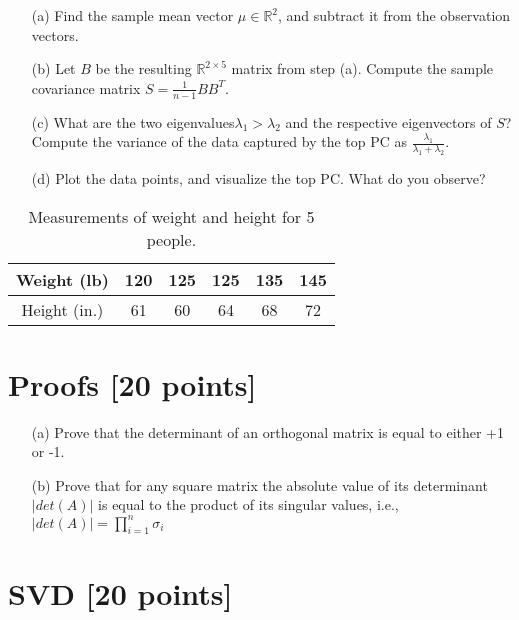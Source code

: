 	\begin{itemize}
		
	\item[(a)] 	 Find the sample mean vector $\mu \in \mathbb{R}^2$, and subtract it from the observation vectors. 
	
	\item[(b)] Let $B$ be the resulting $\mathbb{R}^{2 \times 5}$ matrix from step (a). Compute the sample covariance matrix $S=\frac{1}{n-1}BB^T$. 
	
	\item[(c)] What are the two eigenvalues$\lambda_1 > \lambda_2$ and the respective eigenvectors of $S$? Compute the variance of the data captured by the top PC as $\frac{\lambda_1}{\lambda_1+\lambda_2}$.  
	
	\item[(d)] Plot the data points, and visualize the top PC. What do you observe? 

\end{itemize}


\begin{table}[!h]
	\centering
	\begin{tabular}{|c|ccccc|} \hline
		Weight (lb) & 120 & 125 & 125 & 135 & 145 \\  \hline
		Height (in.)  & 61 & 60 & 64 & 68 & 72 \\ \hline
	\end{tabular}
	\caption{\label{tab:data} Measurements of weight and height for 5 people.}
\end{table}

\section{ Proofs [20 points]}    
\begin{itemize}


	\item[(a)] 	Prove that the determinant of an orthogonal matrix is equal to either +1 or -1.  
	
	 
	\item[(b)] Prove that for any square matrix the absolute value of its determinant$|det(A)|$ is equal to the product of its singular values, i.e., $|det(A)|=\prod_{i=1}^n \sigma_i$  
	 
	
\end{itemize}
   
\section{SVD [20 points]} 

